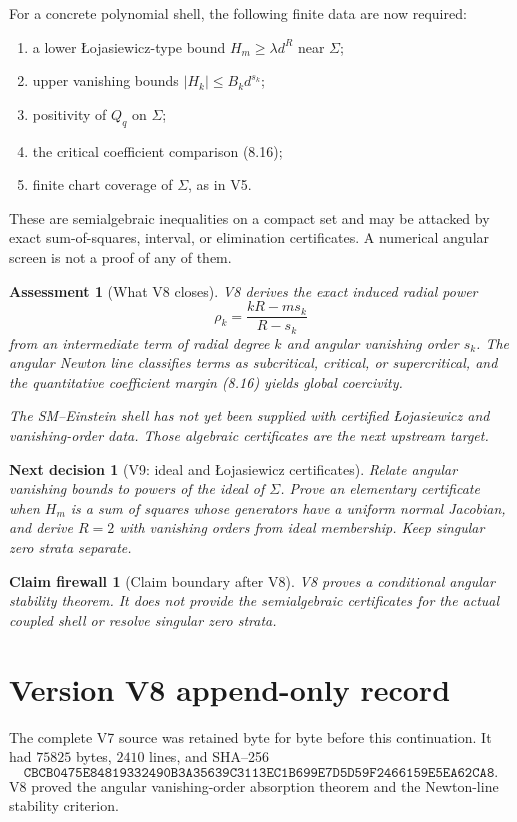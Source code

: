 \documentclass[11pt]{article}
\newtheorem{firewall}[theorem]{Claim firewall}
\newtheorem{decision}[theorem]{Next decision}
\newtheorem{assessment}[theorem]{Assessment}
\theoremstyle{remark}
\begin{document}
For a concrete polynomial shell, the following finite data are now
required:
\begin{enumerate}
\item a lower Łojasiewicz-type bound
      \(H_m\geq\lambda d^R\) near \(\Sigma\);
\item upper vanishing bounds
      \(|H_k|\leq B_kd^{s_k}\);
\item positivity of \(Q_q\) on \(\Sigma\);
\item the critical coefficient comparison (8.16);
\item finite chart coverage of \(\Sigma\), as in V5.
\end{enumerate}
These are semialgebraic inequalities on a compact set and may be
attacked by exact sum-of-squares, interval, or elimination
certificates.  A numerical angular screen is not a proof of any of
them.

\begin{assessment}[What V8 closes]
\label{ass:v17v8-status}
V8 derives the exact induced radial power
\[
 \rho_k=\frac{kR-ms_k}{R-s_k}
\]
from an intermediate term of radial degree \(k\) and angular
vanishing order \(s_k\).  The angular Newton line classifies terms as
subcritical, critical, or supercritical, and the quantitative
coefficient margin (8.16) yields global coercivity.

The SM--Einstein shell has not yet been supplied with certified
Łojasiewicz and vanishing-order data.  Those algebraic certificates
are the next upstream target.
\end{assessment}

\begin{decision}[V9: ideal and Łojasiewicz certificates]
\label{dec:v17v8-next}
Relate angular vanishing bounds to powers of the ideal of
\(\Sigma\).  Prove an elementary certificate when
\(H_m\) is a sum of squares whose generators have a uniform normal
Jacobian, and derive \(R=2\) with vanishing orders from ideal
membership.  Keep singular zero strata separate.
\end{decision}

\begin{firewall}[Claim boundary after V8]
\label{fire:v17v8}
V8 proves a conditional angular stability theorem.  It does not
provide the semialgebraic certificates for the actual coupled shell
or resolve singular zero strata.
\end{firewall}

\section*{Version V8 append-only record}
The complete V7 source was retained byte for byte before this
continuation.  It had \(75825\) bytes, \(2410\) lines, and SHA--256
\[
 \texttt{CBCB0475E84819332490B3A35639C3113EC1B699E7D5D59F2466159E5EA62CA8}.
\]
V8 proved the angular vanishing-order absorption theorem and the
Newton-line stability criterion.
\end{document}
